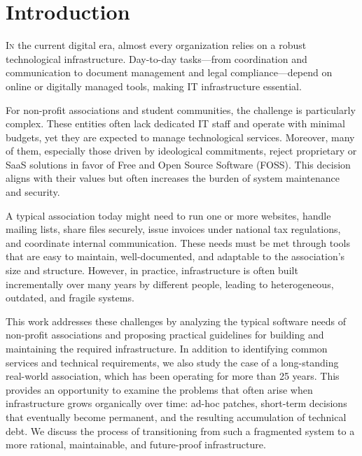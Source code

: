 %

\chapter{Introduction}
\label{chap:introduction}

\lettrine{I}{n} the current digital era, almost every organization relies on a robust technological infrastructure. Day-to-day tasks---from coordination and communication to document management and legal compliance---depend on online or digitally managed tools, making IT infrastructure essential.

For non-profit associations and student communities, the challenge is particularly complex. These entities often lack dedicated IT staff and operate with minimal budgets, yet they are expected to manage technological services. Moreover, many of them, especially those driven by ideological commitments, reject proprietary or SaaS solutions in favor of Free and Open Source Software (FOSS). This decision aligns with their values but often increases the burden of system maintenance and security.

A typical association today might need to run one or more websites, handle mailing lists, share files securely, issue invoices under national tax regulations, and coordinate internal communication. These needs must be met through tools that are easy to maintain, well-documented, and adaptable to the association's size and structure. However, in practice, infrastructure is often built incrementally over many years by different people, leading to heterogeneous, outdated, and fragile systems.

This work addresses these challenges by analyzing the typical software needs of non-profit associations and proposing practical guidelines for building and maintaining the required infrastructure. In addition to identifying common services and technical requirements, we also study the case of a long-standing real-world association, which has been operating for more than 25 years. This provides an opportunity to examine the problems that often arise when infrastructure grows organically over time: ad-hoc patches, short-term decisions that eventually become permanent, and the resulting accumulation of technical debt. We discuss the process of transitioning from such a fragmented system to a more rational, maintainable, and future-proof infrastructure.


